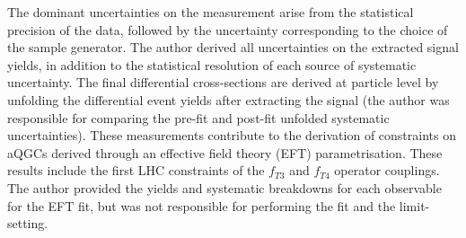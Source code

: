 \documentclass{thesissummary}
\begin{document}
The dominant uncertainties on the measurement arise from the statistical precision of the data, followed by the uncertainty corresponding to the choice of the \qcdwy sample generator.%
The author derived all uncertainties on the extracted signal yields, in addition to the statistical resolution of each source of systematic uncertainty. The final differential cross-sections are derived at particle level by unfolding the differential event yields after extracting the \ewwy signal (the author was responsible for comparing the pre-fit and post-fit unfolded systematic uncertainties). These measurements contribute to the derivation of constraints on aQGCs derived through an effective field theory (EFT) parametrisation. These results include the first LHC constraints of the $f_{T3}$ and $f_{T4}$ operator couplings. The author provided the yields and systematic breakdowns for each observable for the EFT fit, but was not responsible for performing the fit and the limit-setting.
\end{document}
